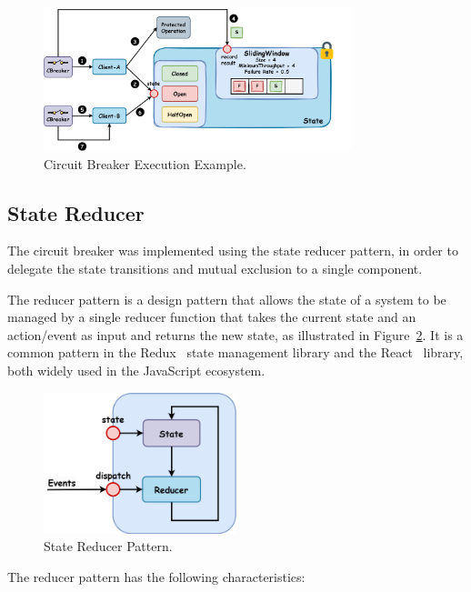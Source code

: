 \begin{figure}[!htb]
    \centering
    \includegraphics[width=0.8\textwidth]{../figures/05_cbreaker-execution-example}
    \caption{Circuit Breaker Execution Example.}
    \label{fig:circuit-breaker-execution-example}
\end{figure}

\subsection{State Reducer}\label{subsec:cbreaker-state-reducer}

The circuit breaker was implemented using the state reducer pattern,
in order to delegate the state transitions and mutual exclusion to a single component.

The reducer pattern is a design pattern
that allows the state of a system
to be managed by a single reducer function
that takes the current state and an action/event as input and returns the new state, as illustrated in Figure~\ref{fig:reducer-pattern}.
It is a common pattern in the Redux~\cite{redux} state management library and the React~\cite{react-use-reducer} library,
both widely used in the JavaScript ecosystem.

\begin{figure}[!htb]
    \centering
    \includegraphics[width=0.5\textwidth]{../figures/05_reducer-pattern}
    \caption{State Reducer Pattern.}
    \label{fig:reducer-pattern}
\end{figure}

The reducer pattern has the following characteristics:

